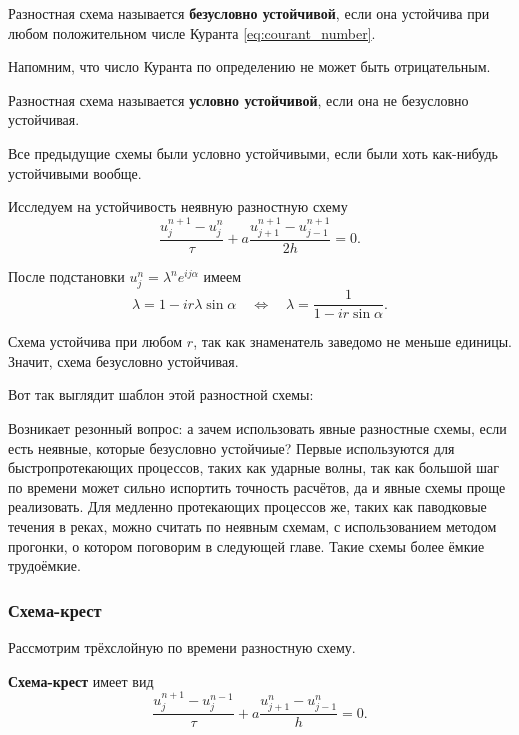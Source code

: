 \documentclass{article}
\begin{document}
\begin{define}
	Разностная схема называется \textbf{безусловно устойчивой}, если она
	устойчива при любом положительном числе Куранта
	\eqref{eq:courant_number}.
\end{define}

Напомним, что число Куранта по определению не может быть отрицательным.

\begin{define}
	Разностная схема называется \textbf{условно устойчивой}, если она не
	безусловно устойчивая.
\end{define}

Все предыдущие схемы были условно устойчивыми, если были хоть как-нибудь
устойчивыми вообще.

\begin{example}
	Исследуем на устойчивость неявную разностную схему
	\[\frac{u_j^{n+1}-u_j^n}{\tau}+a\frac{u_{j+1}^{n+1}-u_{j-1}^{n+1}}{2h}=
	0.\]

	После подстановки $u_j^n=\lambda^ne^{ij\alpha}$ имеем
	\[\lambda=1-ir\lambda\sin\alpha\quad\Leftrightarrow\quad
	\lambda=\frac{1}{1-ir\sin\alpha}.\]

	Схема устойчива при любом $r$, так как знаменатель заведомо не
	меньше единицы. Значит, схема безусловно устойчивая.

	Вот так выглядит шаблон этой разностной схемы: \\

	
\end{example}

Возникает резонный вопрос: а зачем использовать явные разностные схемы, если
есть неявные, которые безусловно устойчиые? Первые используются для
быстропротекающих процессов, таких как ударные волны, так как большой шаг по
времени может сильно испортить точность расчётов, да и явные схемы проще
реализовать. Для медленно протекающих процессов же, таких как паводковые течения
в реках, можно считать по неявным схемам, с использованием методом прогонки,
о котором поговорим в следующей главе. Такие схемы более ёмкие трудоёмкие.

\subsubsection{Схема-крест}
Рассмотрим трёхслойную по времени разностную схему.

\begin{define}
	\textbf{Схема-крест} имеет вид
	\[\frac{u_j^{n+1}-u_j^{n-1}}{\tau}+a\frac{u_{j+1}^n-u_{j-1}^n}{h}=
	0.\]
\end{define}
\end{document}
